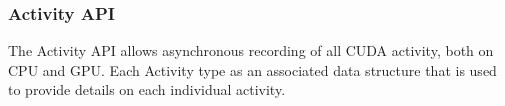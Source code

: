 \subsubsection{Activity API}
\label{sec:cuda:prof:activity}

The Activity API allows asynchronous recording of all CUDA activity, both on CPU and GPU. Each Activity type as an associated data structure that is used to provide details on each individual activity.